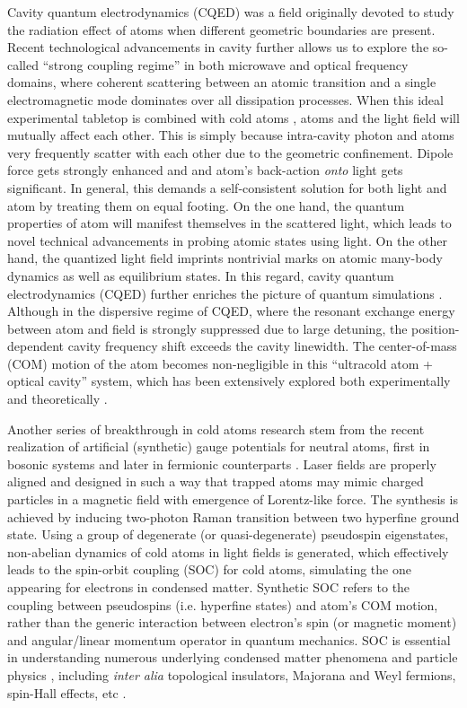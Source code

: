 \documentclass[atoms,article,submit,moreauthors,pdftex,12pt,a4paper]{mdpi}
\begin{document}
Cavity quantum electrodynamics (CQED) was a field originally devoted to study the radiation effect of atoms when different geometric boundaries are present. Recent technological advancements in cavity further allows us to explore the so-called ``strong coupling regime'' in both microwave and optical frequency domains, where coherent scattering between an atomic transition and a single electromagnetic mode dominates over all dissipation processes.  When this ideal experimental tabletop is combined with  cold atoms \cite{cavity1, cavity2, cavity3}, atoms and the light field will mutually affect each other. This is simply because intra-cavity photon and atoms very frequently scatter with each other due to the geometric confinement. Dipole force gets strongly enhanced and and atom's back-action {\em onto} light gets significant. In general, this demands a self-consistent solution for both light and atom by treating them on equal footing. On the one hand, the quantum properties of atom will manifest themselves in the scattered light, which leads to novel technical advancements in probing atomic states using light. On the other hand, the quantized light field imprints nontrivial marks on atomic many-body dynamics as well as equilibrium states. In this regard, cavity quantum electrodynamics (CQED) further enriches the picture of quantum simulations \cite{cavity4, cavity5, cavity6}. Although in the dispersive regime of CQED, where the resonant exchange energy between atom and field is strongly suppressed due to large detuning, the position-dependent cavity frequency shift exceeds the cavity linewidth. The center-of-mass (COM) motion of the atom becomes non-negligible in this ``ultracold atom + optical cavity'' system, which has been extensively explored both experimentally \cite{cavity7, cavity8, cavity9, cavity10, cavity11} and theoretically \cite{cavity12, cavity13}. 

Another series of breakthrough in cold atoms research stem from the recent realization of artificial (synthetic) gauge potentials for neutral atoms, first in bosonic systems \cite{soc1, soc2} and later in fermionic counterparts \cite{soc3, soc4}. Laser fields are properly aligned and designed in such a way that trapped atoms may mimic charged particles in a magnetic field with emergence of Lorentz-like force. The synthesis is achieved by inducing two-photon Raman transition between two hyperfine ground state. Using a group of degenerate (or quasi-degenerate) pseudospin eigenstates, non-abelian dynamics of cold atoms in light fields is generated, which effectively leads to the spin-orbit coupling (SOC) for cold atoms, simulating the one appearing for electrons in condensed matter. Synthetic SOC refers to the coupling between pseudospins (i.e. hyperfine states) and atom's COM motion, rather than the generic interaction between electron's spin (or magnetic moment) and angular/linear momentum operator in quantum mechanics. SOC is essential in understanding numerous underlying condensed matter phenomena and particle physics \cite{socVictor}, including {\em inter alia} topological insulators, Majorana and Weyl fermions, spin-Hall effects, etc \cite{TI, MF, WF, SHE1, SHE2}. 
\end{document}
